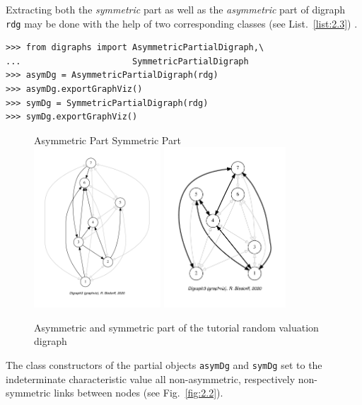 Extracting both the \emph{}\emph{symmetric} part as well as the \emph{asymmetric} part of digraph \texttt{rdg} may be done with the help of two corresponding classes (see List.~\vref{list:2.3}) .
\begin{lstlisting}[caption={Computing asymmetric and symmetric Parts},label=list:2.3]
>>> from digraphs import AsymmetricPartialDigraph,\
...                      SymmetricPartialDigraph
>>> asymDg = AsymmetricPartialDigraph(rdg)
>>> asymDg.exportGraphViz()
>>> symDg = SymmetricPartialDigraph(rdg)
>>> symDg.exportGraphViz()
\end{lstlisting}
\begin{figure}[ht]
  Asymmetric Part \hfill Symmetric Part \\
  \includegraphics[height=6cm]{Figures/2-2-asymmetricPart.pdf}\hfill
  \includegraphics[height=6cm]{Figures/2-2-symmetricPart.pdf}\hfill
\caption{Asymmetric and symmetric part of the tutorial random valuation digraph}
\label{fig:2.2}       %
\end{figure}

The class constructors of the partial objects \texttt{asymDg} and \texttt{symDg} set to the indeterminate characteristic value all non-asymmetric, respectively non-symmetric links between nodes (see Fig.~\vref{fig:2.2}).


